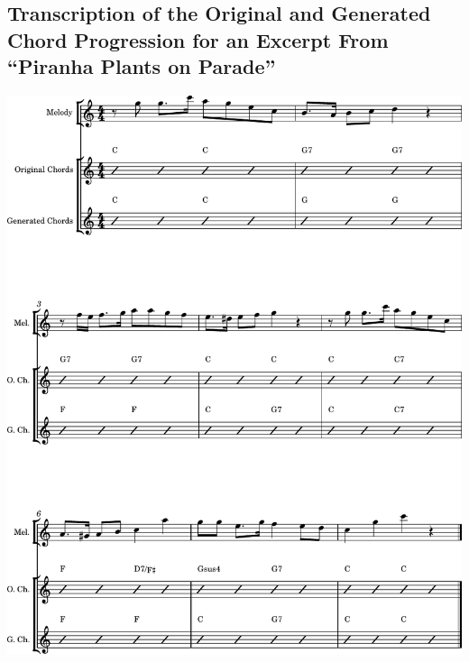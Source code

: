 \clearpage
\subsection{Transcription of the Original and Generated Chord Progression for an Excerpt From ``Piranha Plants on Parade''}
\label{sec:sheet_music_melody}

\includegraphics[page=1, width=\linewidth]{materials/piranha_chords.pdf}
\clearpage







